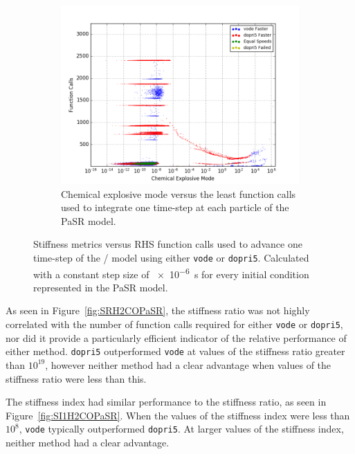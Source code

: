 \documentclass[12pt]{ussci}
\begin{document}
\begin{figure}[htbp]
\begin{subfigure}{0.43\textwidth}
        \label{fig:SI2H2COPaSR}
    \end{subfigure}
    \begin{subfigure}{0.43\textwidth}
        \includegraphics[width=\linewidth]{PaSR_Fn_Work_CEMA_Groupings_1e-06.png}
        \caption{Chemical explosive mode versus the least function calls used to integrate one time-step at each particle of the PaSR model.}
        \label{fig:CEMH2COPaSR}
    \end{subfigure}
    \caption{Stiffness metrics versus RHS function calls used to advance one time-step of the \slash {} model using either \texttt{vode} or \texttt{dopri5}.  Calculated with a constant step size of \SI{e-6}{\second} for every initial condition represented in the PaSR model.}
    \label{fig:H2COPaSRStiffness}
\end{figure}

As seen in Figure~\ref{fig:SRH2COPaSR}, the stiffness ratio was not highly correlated with the number of function calls required for either \texttt{vode} or \texttt{dopri5}, nor did it provide a particularly efficient indicator of the relative performance of either method.
\texttt{dopri5} outperformed \texttt{vode} at values of the stiffness ratio greater than $10^{19}$, however neither method had a clear advantage when values of the stiffness ratio were less than this.

The stiffness index had similar performance to the stiffness ratio, as seen in Figure~\ref{fig:SI1H2COPaSR}.
When the values of the stiffness index were less than $10^8$, \texttt{vode} typically outperformed \texttt{dopri5}.
At larger values of the stiffness index, neither method had a clear advantage.
\end{document}
